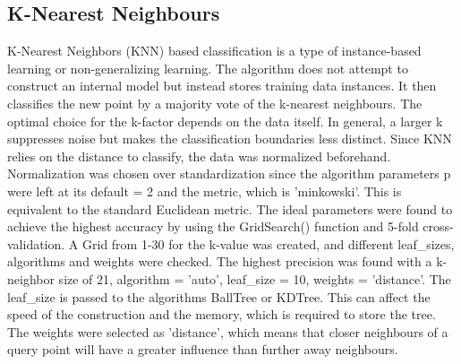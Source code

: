 \documentclass[11pt]{article}
\begin{document}
	
	\subsection{K-Nearest Neighbours}
	K-Nearest Neighbors (KNN) based classification is a type of instance-based learning or non-generalizing learning. The algorithm does not attempt to construct an internal model but instead stores training data instances. It then classifies the new point by a majority vote of the k-nearest neighbours. The optimal choice for the k-factor depends on the data itself. In general, a larger k suppresses noise but makes the classification boundaries less distinct. Since KNN relies on the distance to classify, the data was normalized beforehand. Normalization was chosen over standardization since the algorithm parameters p were left at its default = 2 and the metric, which is 'minkowski'. This is equivalent to the standard Euclidean metric. The ideal parameters were found to achieve the highest accuracy by using the GridSearch() function and 5-fold cross-validation. A Grid from 1-30 for the k-value was created, and different leaf\_sizes, algorithms and weights were checked. The highest precision was found with a k-neighbor size of 21, algorithm = 'auto', leaf\_size = 10, weights = 'distance'. The leaf\_size is passed to the algorithms BallTree or KDTree. This can affect the speed of the construction and the memory, which is required to store the tree. The weights were selected as 'distance', which means that closer neighbours of a query point will have a greater influence than further away neighbours.
		
\end{document}
